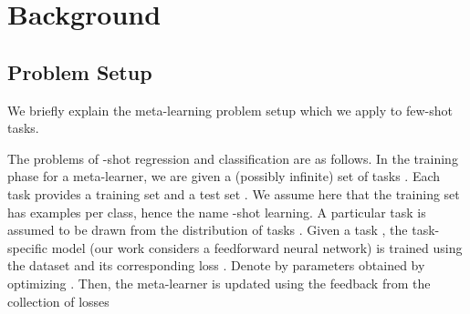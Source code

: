 \documentclass{article}
\newcommand{\0}{{\bf 0}}
\begin{document}
\section{Background}
\label{sec:background}


\iffalse
{\color{red}[BH: This section needs to be completely revised. Discussing three background items is not good idea and makes readers bored.]}
\subsection{Few-shot Learning}

We formalize the few-shot learning problem in this subsection.
Assume we have a parameterized function  that maps observations  to actions .
A task is defined as a tuple  consisting of a distribution over initial observations , a transition distribution , a horizon , and a loss function  that maps a sequence of observations and actions to a real number.

We assume that all tasks come from a common distribution , and our goal is for our function  to be able to quickly minimize loss given any task in .
During (meta-)training, we sample new tasks .
The model sees  examples from  and makes updates and predictions using only that information.
This model is then evaluated on the loss function .
The model typically makes some sort of (meta-)update using this loss function.
At meta-test time, we sample new tasks  and report the loss of  after seeing  examples from .
Tasks used for meta-testing are typically held out during meta-training.
\fi

\subsection{Problem Setup}
\label{subsec:setup}
We briefly explain the meta-learning problem setup which we apply to few-shot tasks.

The problems of -shot regression and classification are as follows.
In the training phase for a meta-learner, we are given a (possibly infinite) set of tasks .
Each task provides a training set and a test set .
We assume here that the training set  has  examples per class, hence the name -shot learning.
A particular task  is assumed to be drawn from the distribution of tasks .
Given a task , the task-specific model  (our work considers a feedforward neural network)
is trained using the dataset  and 
its corresponding loss . 
Denote by  parameters obtained by optimizing .
Then, the meta-learner  is updated using the feedback from the collection of losses
\end{document}
